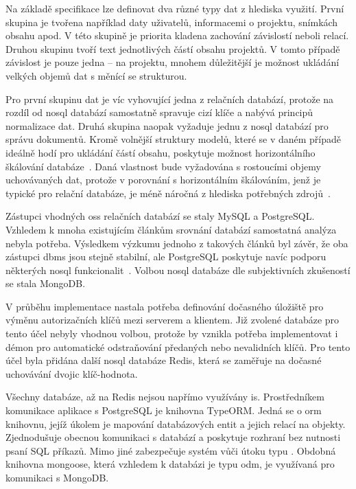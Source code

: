 Na základě specifikace lze definovat dva různé typy dat z hlediska využití. První skupina je tvořena například daty uživatelů, informacemi o projektu, snímkách obsahu apod. V této skupině je priorita kladena zachování závislostí neboli relací. Druhou skupinu tvoří text jednotlivých částí obsahu projektů. V tomto případě závislost je pouze jedna -- na projektu, mnohem důležitější je možnost ukládání velkých objemů dat s měnící se strukturou.

Pro první skupinu dat je víc vyhovující jedna z relačních databází, protože na rozdíl od \gls{nosql} databází samostatně spravuje cizí klíče a nabývá principů normalizace dat. Druhá skupina naopak vyžaduje jednu z \gls{nosql} databází pro správu dokumentů. Kromě volnější struktury modelů, které se v daném případě ideálně hodí pro ukládání částí obsahu, poskytuje možnost horizontálního škálování databáze~\cite{dbScaling}. Daná vlastnost bude vyžadována s rostoucími objemy uchovávaných dat, protože v porovnání s horizontálním škálováním, jenž je typické pro relační databáze, je méně náročná z hlediska potřebných zdrojů~\cite{dbScaling}.


Zástupci vhodných \gls{oss} relačních databází se staly MySQL a PostgreSQL. Vzhledem k mnoha existujícím článkům srovnání databází samostatná analýza nebyla potřeba. Výsledkem výzkumu jednoho z takových článků byl závěr, že oba zástupci \gls{dbms} jsou stejně stabilní, ale PostgreSQL poskytuje navíc podporu některých \gls{nosql} funkcionalit~\cite{mysqlPostgres}. Volbou \gls{nosql} databáze dle subjektivních zkušeností se stala MongoDB.


V průběhu implementace nastala potřeba definování dočasného úložiště pro výměnu autorizačních klíčů mezi serverem a klientem. Již zvolené databáze pro tento účel nebyly vhodnou volbou, protože by vznikla potřeba implementovat i démon pro automatické odstraňování předaných nebo nevalidních klíčů. Pro tento účel byla přidána další \gls{nosql} databáze Redis, která se zaměřuje na dočasné uchovávání dvojic klíč-hodnota.


Všechny databáze, až na Redis nejsou napřímo využívány \gls{is}. Prostředníkem komunikace aplikace s PostgreSQL je knihovna TypeORM. Jedná se o \gls{orm} knihovnu, jejíž úkolem je mapování databázových entit a jejich relací na objekty. Zjednodušuje obecnou komunikaci s databází a poskytuje rozhraní bez nutnosti psaní SQL příkazů. Mimo jiné zabezpečuje systém vůči útoku typu . Obdobná knihovna mongoose, která vzhledem k databázi je typu \gls{odm}, je využívaná pro komunikaci s MongoDB.


